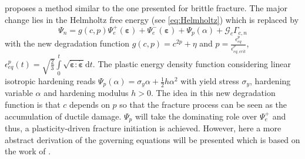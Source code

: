 \begin{table}[!ht]
\begin{center}
\begin{tabular}{|c||c|c|c|}
		\hline
	\end{tabular}
	\end{center}
 \label{fig:plastic}
\end{table}

\citet{06_PF_ductile} proposes a method similar to the one presented for brittle fracture. The major change lies in the Helmholtz free energy (see \eqref{eq:Helmholtz}) which is replaced by
\begin{equation} \label{eq:Helmholtz_ductile1}
	\Psi_{n} = g\left(c,p\right)\Psi_{e}^{+}\left(\bm{\varepsilon}\right)+\Psi_{e}^{-}\left(\bm{\varepsilon}\right)+\Psi_{p}\left(\alpha\right)+\mathcal{G}_{c}\Gamma_{c,n}
\end{equation}
with the new degradation function $g\left(c,p\right)=c^{2p}+\eta$ and $p=\frac{\epsilon_{eq}^{p}}{\epsilon_{eq,crit}^{p}}$, $\epsilon_{eq}^{p}\left(t\right)=\sqrt{\frac{2}{3}}\int\limits_{0}^{t}\sqrt{\dot{\bm{\varepsilon}}:\dot{\bm{\varepsilon}}}\mathrm{d}t$. The plastic energy density function considering linear isotropic hardening reads $\Psi_{p}\left(\alpha\right)=\sigma_{y}\alpha+\frac{1}{2}h\alpha^{2}$ with yield stress $\sigma_{y}$, hardening variable $\alpha$ and hardening modulus $h>0$. The idea in this new degradation function is that $c$ depends on $p$ so that the fracture process can be seen as the accumulation of ductile damage. $\Psi_{p}$ will take the dominating role over $\Psi_{e}^{+}$ and thus, a plasticity-driven fracture initiation is achieved. However, here a more abstract derivation of the governing equations will be presented which is based on the work of \citet{03_PF_ductile}.

